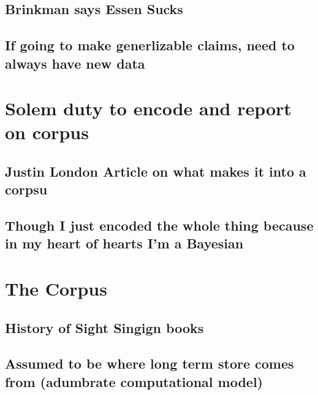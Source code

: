 \documentclass[]{book}
\theoremstyle{definition}
\theoremstyle{definition}
\theoremstyle{definition}
\theoremstyle{remark}
\begin{document}
\hypertarget{brinkman-says-essen-sucks}{%
\subsection{Brinkman says Essen Sucks}\label{brinkman-says-essen-sucks}}

\hypertarget{if-going-to-make-generlizable-claims-need-to-always-have-new-data}{%
\subsection{If going to make generlizable claims, need to always have
new
data}\label{if-going-to-make-generlizable-claims-need-to-always-have-new-data}}

\hypertarget{solem-duty-to-encode-and-report-on-corpus}{%
\section{Solem duty to encode and report on
corpus}\label{solem-duty-to-encode-and-report-on-corpus}}

\hypertarget{justin-london-article-on-what-makes-it-into-a-corpsu}{%
\subsection{Justin London Article on what makes it into a
corpsu}\label{justin-london-article-on-what-makes-it-into-a-corpsu}}

\hypertarget{though-i-just-encoded-the-whole-thing-because-in-my-heart-of-hearts-im-a-bayesian}{%
\subsection{Though I just encoded the whole thing because in my heart of
hearts I'm a
Bayesian}\label{though-i-just-encoded-the-whole-thing-because-in-my-heart-of-hearts-im-a-bayesian}}

\hypertarget{the-corpus}{%
\section{The Corpus}\label{the-corpus}}

\hypertarget{history-of-sight-singign-books}{%
\subsection{History of Sight Singign
books}\label{history-of-sight-singign-books}}

\hypertarget{assumed-to-be-where-long-term-store-comes-from-adumbrate-computational-model}{%
\subsection{Assumed to be where long term store comes from (adumbrate
computational
model)}\label{assumed-to-be-where-long-term-store-comes-from-adumbrate-computational-model}}
\end{document}
